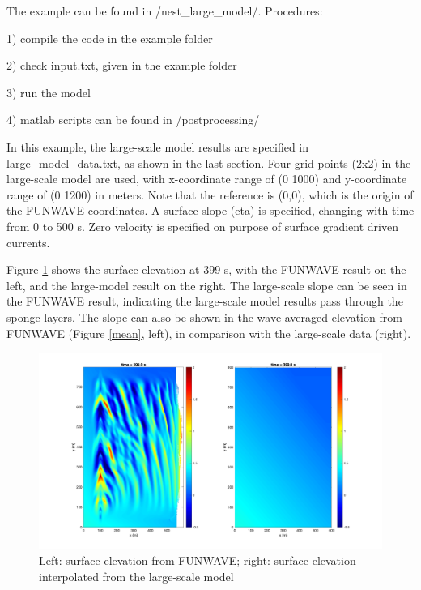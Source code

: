 \documentclass[preprint,10pt]{elsarticle}
\begin{document}
The example can be found in /nest\_large\_model/. Procedures:

1) compile the code in the example folder

2) check input.txt, given in the example folder

3) run the model

4) matlab scripts can be found in /postprocessing/

\vspace{0.5cm}
\noindent
In this example,  the large-scale model results are specified in large\_model\_data.txt, as shown in the last section. Four grid points (2x2) in the large-scale model  are used, with x-coordinate range of (0 1000) and y-coordinate range of (0 1200) in meters. Note that the reference is (0,0), which is the origin of the FUNWAVE coordinates. A surface slope (eta) is specified, changing with time from 0 to 500 s. Zero velocity is specified on purpose of surface gradient driven currents. 

Figure \ref{surface} shows the surface elevation at 399 s, with the FUNWAVE result on the left, and the large-model result on the right. The large-scale slope can be seen in the FUNWAVE result, indicating the large-scale model results pass through the sponge layers. The slope can also be shown in the wave-averaged elevation from FUNWAVE (Figure \ref{mean}, left), in comparison with the large-scale data (right). 

 \begin{figure}
\begin{center}
 \includegraphics[width=1.0\textwidth]{figures/elevation_view.jpg}
 \caption{Left: surface elevation from FUNWAVE; right: surface elevation interpolated from the large-scale model }
 \label{surface}
 \end{center}
 \end{figure}  
  
\end{document}
